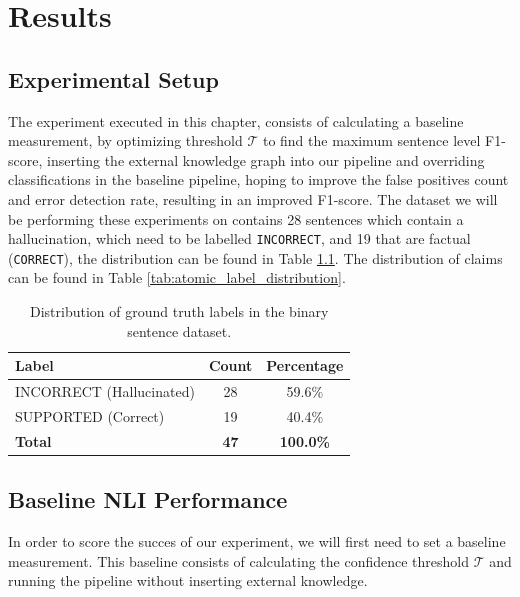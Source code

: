 \chapter{Results}\label{results}
\section{Experimental Setup}
The experiment executed in this chapter, consists of calculating a baseline measurement, by optimizing threshold $\mathcal{T}$ to find the maximum sentence level F1-score, inserting the external knowledge graph into our pipeline and overriding classifications in the baseline pipeline, hoping to improve the false positives count and error detection rate, resulting in an improved F1-score. 
The dataset we will be performing these experiments on contains 28 sentences which contain a hallucination, which need to be labelled \texttt{INCORRECT}, and 19 that are factual (\texttt{CORRECT}), the distribution can be found in Table \ref{tab:sentence_ground_truth_distribution}. The distribution of claims can be found in Table \ref{tab:atomic_label_distribution}. 

\begin{table}[ht]
    \centering
    \caption{Distribution of ground truth labels in the binary sentence dataset.}
    \label{tab:sentence_ground_truth_distribution}
    \begin{tabular}{lcc}
        \toprule
        \textbf{Label} & \textbf{Count} & \textbf{Percentage} \\
        \midrule
        INCORRECT (Hallucinated) & 28 & 59.6\% \\
        SUPPORTED (Correct) & 19 & 40.4\% \\
        \midrule
        \textbf{Total} & \textbf{47} & \textbf{100.0\%} \\
        \bottomrule
    \end{tabular}
\end{table}

\section{Baseline NLI Performance}
In order to score the succes of our experiment, we will first need to set a baseline measurement. This baseline consists of calculating the confidence threshold $\mathcal{T}$ and running the pipeline without inserting external knowledge. 

